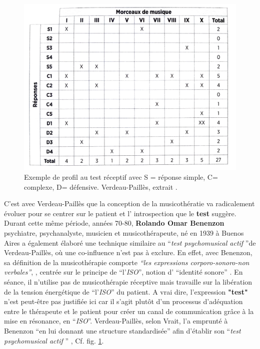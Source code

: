 \begin{center}
	\begin{figure}
		\label{morceauxDeMusique}
		\includegraphics[width=0.9\linewidth]{images/graphiques/verdeaupailles.png}	
		\caption[Profil test réceptif Verdeau-Paillès]{Exemple de profil au test réceptif avec S = réponse 
		simple, C= complexe, D= défensive. 
		Verdeau-Paillès, extrait \autocite[p.89] {lecourt_les_2017}.}
	\end{figure}	
\end{center}
C'est avec Verdeau-Paillès que la conception de la musicothératie va radicalement évoluer pour se 
centrer sur le patient et l' introspection que le \textbf{test} suggère.
Durant cette même période, années 70-80,
\textbf{ Rolando Omar Benenzon} psychiatre, psychanalyste,
musicien et musicothérapeute, né en 1939 à Buenos Aires a également élaboré une technique similaire au \enquote {\textit{test psychomusical actif} }de Verdeau-Paillès,
 où une co-influence n'est pas à exclure.
 En effet, avec Benenzon, sa définition de la musicothérapie comporte
\emph{\textsl{ ``les expressions corporo-sonoro-non
     verbales''}}, \autocite{benenzon:musicotherapie},
centrée sur le principe de \enquote{l'\textit{ISO}}, notion
 d' \enquote{identité sonore} \autocite{benenzon:musicotherapie}.
En séance, il n'utilise pas de
 musicothérapie réceptive mais travaille sur la libération de
 la tension énergétique de \enquote{l'\textit{ISO}} du patient.
A vrai dire, l'expression \textbf{"test"} n'est peut-être pas justifiée ici car il s'agit plutôt d'un processus 
d'adéquation entre le thérapeute et le patient pour créer un canal de communication grâce à la mise en 
résonance, en \enquote{\textit{ISO}}. Verdeau-Paillès, selon Vrait, l'a emprunté à Benenzon  \enquote {en 
lui donnant une structure standardisée} afin d'établir son \enquote {\textit{test psychomusical actif} } 
\autocite[p. 39]{vrait_musicotherapie_2018}, Cf. fig. \ref{morceauxDeMusique}.

